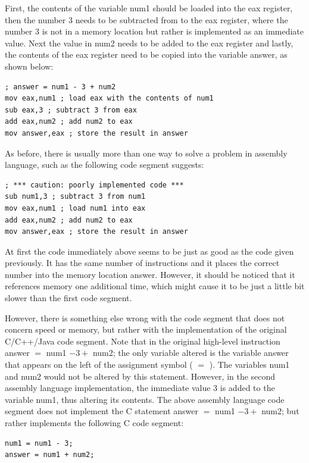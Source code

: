 \documentclass[10pt]{article}
\begin{document}
First, the contents of the variable num1 should be loaded into the eax register, then the number 3 needs to be subtracted from to the eax register, where the number 3 is not in a memory location but rather is implemented as an immediate\\
value. Next the value in num2 needs to be added to the eax register and lastly, the contents of the eax register need to be copied into the variable answer, as shown below:

\begin{verbatim}
; answer = num1 - 3 + num2
mov eax,num1 ; load eax with the contents of num1
sub eax,3 ; subtract 3 from eax
add eax,num2 ; add num2 to eax
mov answer,eax ; store the result in answer
\end{verbatim}

As before, there is usually more than one way to solve a problem in assembly language, such as the following code segment suggests:

\begin{verbatim}
; *** caution: poorly implemented code ***
sub num1,3 ; subtract 3 from num1
mov eax,num1 ; load num1 into eax
add eax,num2 ; add num2 to eax
mov answer,eax ; store the result in answer
\end{verbatim}

At first the code immediately above seems to be just as good as the code given previously. It has the same number of instructions and it places the correct number into the memory location answer. However, it should be noticed that it references memory one additional time, which might cause it to be just a little bit slower than the first code segment.

However, there is something else wrong with the code segment that does not concern speed or memory, but rather with the implementation of the original C/C++/Java code segment. Note that in the original high-level instruction answer $=$ num1 $-3+$ num2; the only variable altered is the variable answer that appears on the left of the assignment symbol ( $=$ ). The variables num1 and num2 would not be altered by this statement. However, in the second assembly language implementation, the immediate value 3 is added to the variable num1, thus altering its contents. The above assembly language code segment does not implement the C statement answer $=$ num1 $-3+$ num2; but rather implements the following C code segment:

\begin{verbatim}
num1 = num1 - 3;
answer = num1 + num2;
\end{verbatim}
\end{document}
